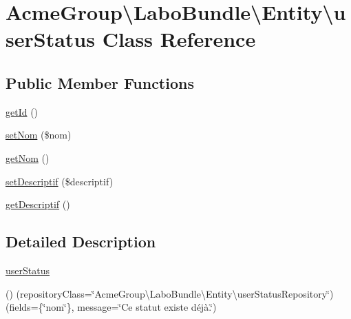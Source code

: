 \hypertarget{class_acme_group_1_1_labo_bundle_1_1_entity_1_1user_status}{\section{Acme\+Group\textbackslash{}Labo\+Bundle\textbackslash{}Entity\textbackslash{}user\+Status Class Reference}
\label{class_acme_group_1_1_labo_bundle_1_1_entity_1_1user_status}
}
\subsection*{Public Member Functions}
\begin{DoxyCompactItemize}
\item 
\hyperlink{class_acme_group_1_1_labo_bundle_1_1_entity_1_1user_status_a2613f7835e41e6290985d8c2bb43bf0a}{get\+Id} ()
\item 
\hyperlink{class_acme_group_1_1_labo_bundle_1_1_entity_1_1user_status_a048d9f9fdd36a3d0cbc430e53bec692c}{set\+Nom} (\$nom)
\item 
\hyperlink{class_acme_group_1_1_labo_bundle_1_1_entity_1_1user_status_a9f1b00ac327c9b63015e0163329626e3}{get\+Nom} ()
\item 
\hyperlink{class_acme_group_1_1_labo_bundle_1_1_entity_1_1user_status_ac6534d92032702ff8bdb6c5556327659}{set\+Descriptif} (\$descriptif)
\item 
\hyperlink{class_acme_group_1_1_labo_bundle_1_1_entity_1_1user_status_ae442eeca35c92f26c7ea65866163fce4}{get\+Descriptif} ()
\end{DoxyCompactItemize}


\subsection{Detailed Description}
\hyperlink{class_acme_group_1_1_labo_bundle_1_1_entity_1_1user_status}{user\+Status}

() (repository\+Class=\char`\"{}\+Acme\+Group\textbackslash{}\+Labo\+Bundle\textbackslash{}\+Entity\textbackslash{}user\+Status\+Repository\char`\"{}) (fields=\{\char`\"{}nom\char`\"{}\}, message=\char`\"{}\+Ce statut existe déjà.\char`\"{}) 


